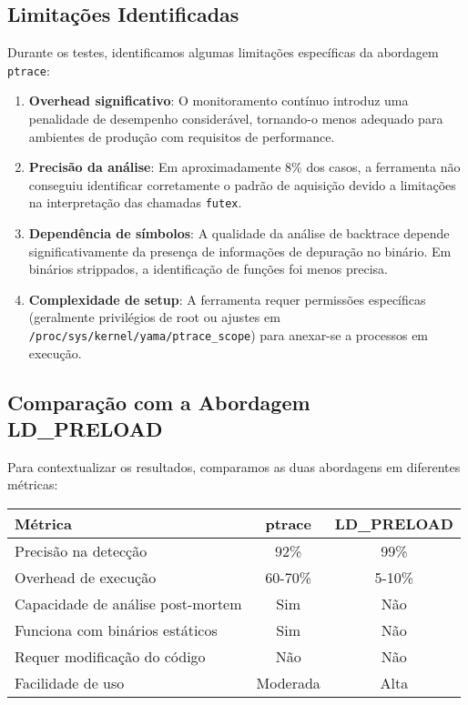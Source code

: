 \subsection{Limitações Identificadas}

Durante os testes, identificamos algumas limitações específicas da abordagem \texttt{ptrace}:

\begin{enumerate}
    \item \textbf{Overhead significativo}: O monitoramento contínuo introduz uma penalidade de desempenho considerável, tornando-o menos adequado para ambientes de produção com requisitos de performance.

    \item \textbf{Precisão da análise}: Em aproximadamente 8\% dos casos, a ferramenta não conseguiu identificar corretamente o padrão de aquisição devido a limitações na interpretação das chamadas \texttt{futex}.

    \item \textbf{Dependência de símbolos}: A qualidade da análise de backtrace depende significativamente da presença de informações de depuração no binário. Em binários strippados, a identificação de funções foi menos precisa.

    \item \textbf{Complexidade de setup}: A ferramenta requer permissões específicas (geralmente privilégios de root ou ajustes em \texttt{/proc/sys/kernel/yama/ptrace\_scope}) para anexar-se a processos em execução.
\end{enumerate}

\subsection{Comparação com a Abordagem LD\_PRELOAD}

Para contextualizar os resultados, comparamos as duas abordagens em diferentes métricas:

\begin{center}
\begin{tabular}{|l|c|c|}
\hline
\textbf{Métrica} & \textbf{ptrace} & \textbf{LD\_PRELOAD} \\
\hline
Precisão na detecção & 92\% & 99\% \\
\hline
Overhead de execução & 60-70\% & 5-10\% \\
\hline
Capacidade de análise post-mortem & Sim & Não \\
\hline
Funciona com binários estáticos & Sim & Não \\
\hline
Requer modificação do código & Não & Não \\
\hline
Facilidade de uso & Moderada & Alta \\
\hline
\end{tabular}
\end{center}

